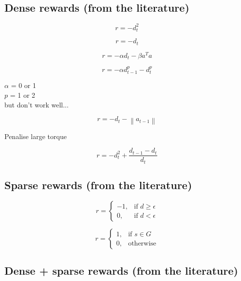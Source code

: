 \documentclass{article}
\newcommand{\norm}[1]{\left\lVert#1\right\rVert}
\begin{document}
\subsection{Dense rewards (from the literature)}

\begin{equation}
r = - d_t^2
\end{equation}


\begin{equation}
r = - d_t
\end{equation}


\begin{equation}
r = -\alpha d_t - \beta a^T a
\end{equation}

\begin{equation}
r = -\alpha d_{t-1}^p - d_t^p 
\end{equation}

$\alpha$ = 0 or 1 \\
$p$ = 1 or 2 \\
but don't work well...

\begin{equation}
r = - d_t -  \norm{a_{t-1}}
\end{equation}

Penalise large torque

\begin{equation}
r = - d_t^2+ \frac{d_{t-1} - d_t}{d_t}
\end{equation}

\subsection{Sparse rewards (from the literature)}

\begin{equation}
r = \begin{cases}
    -1, & \text{if $d \geq \epsilon $}\\
    0, & \text{if $d < \epsilon $}
  \end{cases}
\end{equation}

\begin{equation}
r = \begin{cases}
    1, & \text{if $s \in G $}\\
    0, & \text{otherwise}
  \end{cases}
\end{equation}


\subsection{Dense + sparse rewards (from the literature)}
\end{document}
